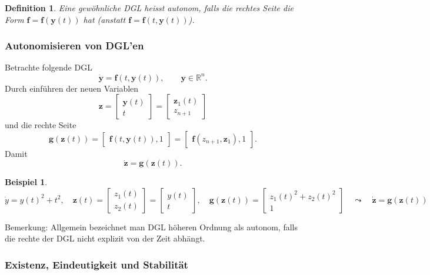 \documentclass[a4paper]{article}
\newtheorem{defn}{Definition}
\newtheorem{bsp}{Beispiel}
\renewcommand{\vec}[1]{\mathbf{\bm{#1}}}
\begin{document}
\begin{defn}
  Eine gewöhnliche DGL heisst autonom, falls die rechtes Seite die Form
  $\vec{f} = \vec{f}(\vec{y}(t))$ hat (anstatt $\vec{f} = \vec{f}(t,
  \vec{y}(t))$).
\end{defn}

\subsubsection*{Autonomisieren von DGL'en}

Betrachte folgende DGL
\[
  \dot{\vec{y}} = \vec{f}(t, \vec{y}(t)), \qquad
  \vec{y} \in \mathbb{R}^n.
\]
Durch einführen der neuen Variablen
\[
  \vec{z} = \begin{bmatrix}
    \vec{y}(t) \\ t
  \end{bmatrix} = \begin{bmatrix}
    \vec{z}_1(t) \\ z_{n+1}
  \end{bmatrix}
\]
und die rechte Seite
\[
  \vec{g}(\vec{z}(t)) = \begin{bmatrix}
    \vec{f}(t, \vec{y}(t)), 1
  \end{bmatrix} = \begin{bmatrix}
    \vec{f}(z_{n+1}, \vec{z}_1), 1
  \end{bmatrix}.
\]
Damit
\[
  \dot{\vec{z}} = \vec{g}(\vec{z}(t)).
\]

\begin{bsp}
  \[
    \dot{y} = y(t)^2 + t^2,
    \quad
    \vec{z}(t) = \begin{bmatrix}
      z_1(t) \\ z_2(t) 
    \end{bmatrix} = \begin{bmatrix}
      y(t) \\ t
    \end{bmatrix},
    \quad
    \vec{g}(\vec{z}(t)) = \begin{bmatrix}
      z_1(t)^2 + z_2(t)^2 \\ 1
    \end{bmatrix}
    \quad\leadsto\quad
    \dot{\vec{z}} = \vec{g}(\vec{z}(t))
  \]
\end{bsp}

Bemerkung: Allgemein bezeichnet man DGL höheren Ordnung als autonom, falls die
rechte der DGL nicht explizit von der Zeit abhängt.

\subsubsection{Existenz, Eindeutigkeit und Stabilität}
\end{document}
